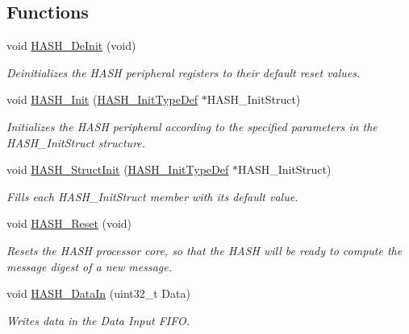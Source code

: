 \subsection*{Functions}
\begin{DoxyCompactItemize}
\item 
void \hyperlink{group___h_a_s_h_ga88717fe3a4f557182841a958e1dcd9c7}{H\-A\-S\-H\-\_\-\-De\-Init} (void)
\begin{DoxyCompactList}\small\item\em Deinitializes the H\-A\-S\-H peripheral registers to their default reset values. \end{DoxyCompactList}\item 
void \hyperlink{group___h_a_s_h_ga4a7d33f0954ac0463a6cda81121635cf}{H\-A\-S\-H\-\_\-\-Init} (\hyperlink{struct_h_a_s_h___init_type_def}{H\-A\-S\-H\-\_\-\-Init\-Type\-Def} $\ast$H\-A\-S\-H\-\_\-\-Init\-Struct)
\begin{DoxyCompactList}\small\item\em Initializes the H\-A\-S\-H peripheral according to the specified parameters in the H\-A\-S\-H\-\_\-\-Init\-Struct structure. \end{DoxyCompactList}\item 
void \hyperlink{group___h_a_s_h_ga9cfaaa73eafec40a06154f58d48adeb5}{H\-A\-S\-H\-\_\-\-Struct\-Init} (\hyperlink{struct_h_a_s_h___init_type_def}{H\-A\-S\-H\-\_\-\-Init\-Type\-Def} $\ast$H\-A\-S\-H\-\_\-\-Init\-Struct)
\begin{DoxyCompactList}\small\item\em Fills each H\-A\-S\-H\-\_\-\-Init\-Struct member with its default value. \end{DoxyCompactList}\item 
void \hyperlink{group___h_a_s_h_ga11745813cf85a08b2058aac3bd026e4d}{H\-A\-S\-H\-\_\-\-Reset} (void)
\begin{DoxyCompactList}\small\item\em Resets the H\-A\-S\-H processor core, so that the H\-A\-S\-H will be ready to compute the message digest of a new message. \end{DoxyCompactList}\item 
void \hyperlink{group___h_a_s_h_ga9c4c0cebdeb1ce2631dd2eeab82107ef}{H\-A\-S\-H\-\_\-\-Data\-In} (uint32\-\_\-t Data)
\begin{DoxyCompactList}\small\item\em Writes data in the Data Input F\-I\-F\-O. \end{DoxyCompactList}\item 

\end{DoxyCompactItemize}
